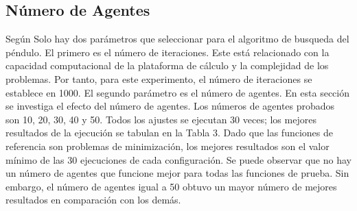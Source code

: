 \documentclass[conference]{IEEEtran}
\begin{document}
\subsection{Número de Agentes}
Según \cite{aziz2022} Solo hay dos parámetros que seleccionar para el algoritmo
de busqueda del péndulo. El
primero es el número de iteraciones. Este está relacionado con la capacidad
computacional de la plataforma de cálculo y la complejidad de los problemas.
Por tanto, para este experimento, el número de iteraciones se establece en
1000. El segundo parámetro es el número de agentes. En esta sección se
investiga el efecto del número de agentes. Los números de agentes probados son
10, 20, 30, 40 y 50. Todos los ajustes se ejecutan 30 veces; los mejores
resultados de la ejecución se tabulan en la Tabla 3. Dado que las funciones de
referencia son problemas de minimización, los mejores resultados son el valor
mínimo de las 30 ejecuciones de cada configuración. Se puede observar que no
hay un número de agentes que funcione mejor para todas las funciones de prueba.
Sin embargo, el número de agentes igual a 50 obtuvo un mayor número de mejores
resultados en comparación con los demás.
\end{document}
